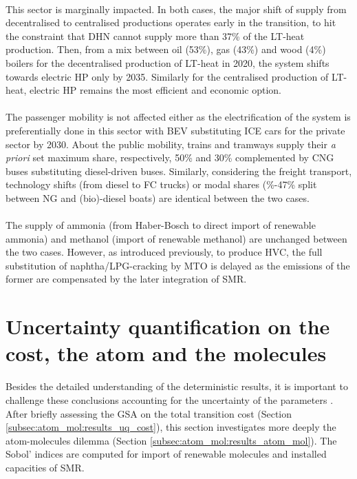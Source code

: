\\

This sector is marginally impacted. In both cases, the major shift of supply from decentralised to centralised productions operates early in the transition, to hit the constraint that \gls{DHN} cannot supply more than 37\% of the \gls{LT}-heat production. Then, from a mix between oil (53\%), gas (43\%) and wood (4\%) boilers for the decentralised production of \gls{LT}-heat in 2020, the system shifts towards electric \gls{HP} only by 2035. Similarly for the centralised production of \gls{LT}-heat, electric \gls{HP} remains the most efficient and economic option.\\

\\

The passenger mobility is not affected either as the electrification of the system is preferentially done in this sector with \gls{BEV} substituting \gls{ICE} cars for the private sector by 2030. About the public mobility, trains and tramways supply their \textit{a priori} set maximum share, respectively, 50\% and 30\% complemented by \gls{CNG} buses substituting diesel-driven buses. Similarly, considering the freight transport, technology shifts (\ie from diesel to \gls{FC} trucks) or modal shares (\%-47\% split between \gls{NG} and (bio)-diesel boats) are identical between the two cases.\\

\\

The supply of ammonia (\ie from Haber-Bosch to direct import of renewable ammonia) and methanol (\ie import of renewable methanol) are unchanged between the two cases. However, as introduced previously, to produce \gls{HVC}, the full substitution of naphtha/LPG-cracking by \gls{MTO} is delayed as the emissions of the former are compensated by the later integration of \gls{SMR}.

\section{Uncertainty quantification on the cost, the atom and the molecules}
\label{sec:atom_mol:results_uq}
Besides the detailed understanding of the deterministic results, it is important to challenge these conclusions accounting for the uncertainty of the parameters \cite{guevara2020machine}. After briefly assessing the \acrfull{GSA} on the total transition cost (Section \ref{subsec:atom_mol:results_uq_cost}), this section investigates more deeply the atom-molecules dilemma (Section \ref{subsec:atom_mol:results_atom_mol}). The Sobol' indices are computed for import of renewable molecules and installed capacities of \gls{SMR}.

